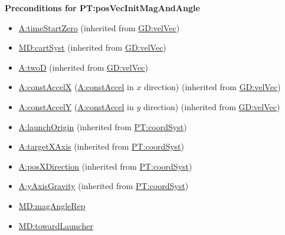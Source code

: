 \documentclass[12pt]{article}
\begin{document}
\noindent \textbf{Preconditions for PT:posVecInitMagAndAngle}
\begin{itemize}
\item \hyperref[timeStartZero]{A:timeStartZero} (inherited from \hyperref[GD:velVec]{GD:velVec})
\item \hyperref[MD:cartSyst]{MD:cartSyst} (inherited from \hyperref[GD:velVec]{GD:velVec})
\item \hyperref[twoD]{A:twoD} (inherited from \hyperref[GD:velVec]{GD:velVec})
\item \hyperref[constAccelX]{A:constAccelX} (\hyperref[constAccel]{A:constAccel}
in $x$ direction) (inherited from \hyperref[GD:velVec]{GD:velVec})
\item \hyperref[constAccelY]{A:constAccelY} (\hyperref[constAccel]{A:constAccel}
in $y$ direction) (inherited from \hyperref[GD:velVec]{GD:velVec})
\item \hyperref[launchOrigin]{A:launchOrigin} (inherited from \hyperref[PT:coordSyst]{PT:coordSyst})
\item \hyperref[targetXAxis]{A:targetXAxis} (inherited from \hyperref[PT:coordSyst]{PT:coordSyst})
\item \hyperref[posXDirection]{A:posXDirection} (inherited from \hyperref[PT:coordSyst]{PT:coordSyst})
\item \hyperref[yAxisGravity]{A:yAxisGravity} (inherited from \hyperref[PT:coordSyst]{PT:coordSyst})
\item \hyperref[MD:magAngleRep]{MD:magAngleRep}
\item \hyperref[MD:towardLauncher]{MD:towardLauncher}
\end{itemize}
\end{document}
